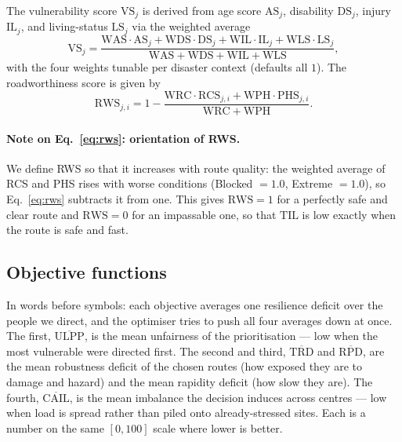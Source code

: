 \documentclass[applsci,article,submit,moreauthors,pdftex]{Definitions/mdpi}
\begin{document}
The vulnerability score $\mathrm{VS}_j$ is derived from age score
$\mathrm{AS}_j$, disability $\mathrm{DS}_j$, injury $\mathrm{IL}_j$, and
living-status $\mathrm{LS}_j$ via the weighted average
\begin{equation}
    \mathrm{VS}_j = \frac{\mathrm{WAS}\cdot\mathrm{AS}_j + \mathrm{WDS}\cdot\mathrm{DS}_j +
                          \mathrm{WIL}\cdot\mathrm{IL}_j + \mathrm{WLS}\cdot\mathrm{LS}_j}
                         {\mathrm{WAS} + \mathrm{WDS} + \mathrm{WIL} + \mathrm{WLS}},
    \label{eq:vs}
\end{equation}
with the four weights tunable per disaster context (defaults all $1$). The
roadworthiness score is given by
\begin{equation}
    \mathrm{RWS}_{j,i} = 1 - \frac{\mathrm{WRC}\cdot\mathrm{RCS}_{j,i} + \mathrm{WPH}\cdot\mathrm{PHS}_{j,i}}
                                  {\mathrm{WRC} + \mathrm{WPH}}.
    \label{eq:rws}
\end{equation}

\paragraph{Note on Eq.~\eqref{eq:rws}: orientation of RWS.}
We define RWS so that it increases with route quality: the weighted average
of RCS and PHS rises with worse conditions (Blocked $= 1.0$, Extreme $= 1.0$),
so Eq.~\eqref{eq:rws} subtracts it from one. This gives $\mathrm{RWS} = 1$ for
a perfectly safe and clear route and $\mathrm{RWS} = 0$ for an impassable one,
so that $\mathrm{TIL}$ is low exactly when the route is safe and fast.

\subsection{Objective functions}\label{sec:model-objectives}

In words before symbols: each objective averages one resilience deficit over
the people we direct, and the optimiser tries to push all four averages down at
once. The first, $\overline{\mathrm{ULPP}}$, is the mean unfairness of the
prioritisation --- low when the most vulnerable were directed first. The second
and third, $\overline{\mathrm{TRD}}$ and $\overline{\mathrm{RPD}}$, are the mean
robustness deficit of the chosen routes (how exposed they are to damage and
hazard) and the mean rapidity deficit (how slow they are). The fourth,
$\overline{\mathrm{CAIL}}$, is the mean imbalance the decision induces across
centres --- low when load is spread rather than piled onto already-stressed
sites. Each is a number on the same $[0,100]$ scale where lower is better.
\end{document}
